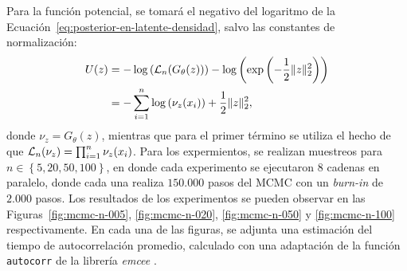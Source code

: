 Para la función potencial, se tomará el negativo del logaritmo de la Ecuación~\ref{eq:posterior-en-latente-densidad}, salvo las constantes de normalización:
\begin{align}
    U(z)
     & = -\log\left( \mathcal{L}_n(G_\theta(z)) \right) - \log\left(
    \exp\left( -\frac{1}{2} \| z \|_2^2 \right)
    \right)                                                  \\
     & = -\sum_{i=1}^{n} \log\left( \nu_z(x_i) \right)
    + \frac{1}{2} \| z \|_2^2,
\end{align}
donde $\nu_z = G_\theta(z)$, mientras que para el primer término se utiliza el hecho de que $\mathcal{L}_n(\nu_z) = \prod_{i=1}^{n} \nu_z(x_i)$. Para los expermientos, se realizan muestreos para $n \in \left\{ 5, 20, 50, 100 \right\}$, en donde cada experimento se ejecutaron $8$ cadenas en paralelo, donde cada una realiza $150.000$ pasos del MCMC con un \textit{burn-in} de $2.000$ pasos. Los resultados de los experimentos se pueden observar en las Figuras~\ref{fig:mcmc-n-005}, \ref{fig:mcmc-n-020}, \ref{fig:mcmc-n-050} y \ref{fig:mcmc-n-100} respectivamente. En cada una de las figuras, se adjunta una estimación del tiempo de autocorrelación promedio, calculado con una adaptación de la función \texttt{autocorr} de la librería \textit{emcee} \cite{foreman2013emcee}.

